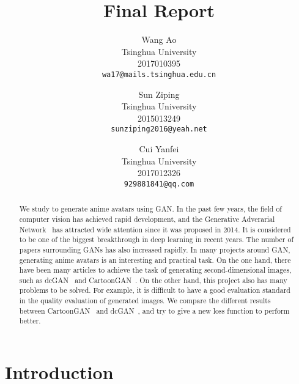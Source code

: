 \documentclass[10pt,twocolumn,letterpaper]{article}
\begin{document}
\title{Final Report}

\author{Wang Ao\\
Tsinghua University\\
2017010395\\
{\tt\small wa17@mails.tsinghua.edu.cn}
\and
Sun Ziping\\
Tsinghua University\\
2015013249\\
{\tt\small sunziping2016@yeah.net}
\and
Cui Yanfei\\
Tsinghua University\\
2017012326\\
{\tt\small 929881841@qq.com}
}

\maketitle

\begin{abstract}
   We study to generate anime avatars using GAN. In the past few years, 
   the field of computer vision has achieved rapid development, and the Generative Adverarial 
   Network~\cite{GAN} has attracted wide attention since it was proposed in 2014. 
   It is considered to be one of the biggest breakthrough in deep learning in recent 
   years. The number of papers surrounding GANs has also increased rapidly. In many projects
   around GAN, generating anime avatars is an interesting and practical task. On the
   one hand, there have been many articles to achieve the task of generating 
   second-dimensional images, such as dcGAN~\cite{dcGAN} and CartoonGAN~\cite{CartoonGAN}.
   On the other hand, this project also has many problems to be solved. For example, 
   it is difficult to have a good evaluation standard in the quality evaluation of generated 
   images. We compare the different results between CartoonGAN~\cite{CartoonGAN} and dcGAN~\cite{dcGAN},
   and try to give a new loss function to perform better.
\end{abstract}

\section{Introduction}
\end{document}
